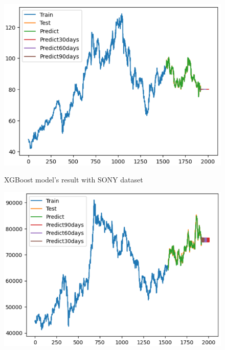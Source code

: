 \documentclass{article}
\begin{document}
\begin{multicols}{2}
\begin{figure}[H]
\begin{minipage}{0.15\textwidth}
    \label{fig:2}
    \end{minipage}%
    \begin{minipage}{0.15\textwidth}
    \centering
    \includegraphics[width=1\textwidth]{Image/XGBoost/XGBoost_SONY_8_2.png}

    \label{fig:3}
    \end{minipage}
    \caption{ XGBoost model's result with SONY dataset }
\end{figure}



\begin{figure}[H]
    \centering
    \begin{minipage}{0.15\textwidth}
    \centering
    \includegraphics[width=1\textwidth]{Image/XGBoost/XGBoost_SAMSUNG_6_4.png}
   

\end{minipage}
\end{figure}
\end{multicols}
\end{document}
